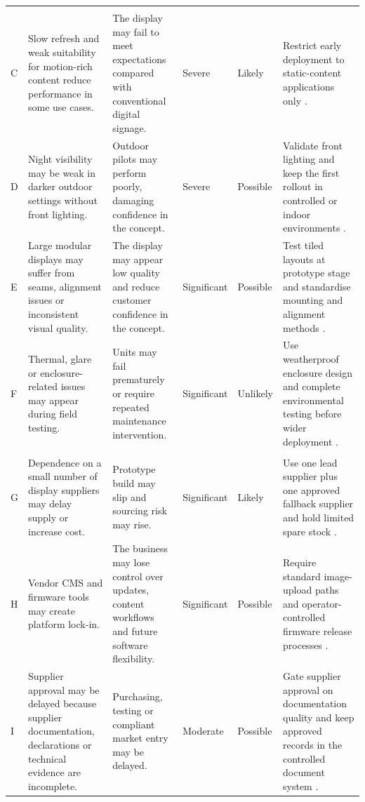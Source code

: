 \documentclass[11pt,a4paper]{article}
\begin{document}
\begin{longtable}{L{0.8cm}L{3.5cm}L{3.2cm}L{1.3cm}L{1.4cm}L{3.8cm}}
\addlinespace
{} \\
C & Slow refresh and weak suitability for motion-rich content reduce performance in some use cases. & The display may fail to meet expectations compared with conventional digital signage. & Severe & Likely & Restrict early deployment to static-content applications only \cite{ref2}. \\
D & Night visibility may be weak in darker outdoor settings without front lighting. & Outdoor pilots may perform poorly, damaging confidence in the concept. & Severe & Possible & Validate front lighting and keep the first rollout in controlled or indoor environments \cite{ref2}. \\
E & Large modular displays may suffer from seams, alignment issues or inconsistent visual quality. & The display may appear low quality and reduce customer confidence in the concept. & Significant & Possible & Test tiled layouts at prototype stage and standardise mounting and alignment methods \cite{ref2}. \\
F & Thermal, glare or enclosure-related issues may appear during field testing. & Units may fail prematurely or require repeated maintenance intervention. & Significant & Unlikely & Use weatherproof enclosure design and complete environmental testing before wider deployment \cite{ref2}. \\

\addlinespace
{} \\
G & Dependence on a small number of display suppliers may delay supply or increase cost. & Prototype build may slip and sourcing risk may rise. & Significant & Likely & Use one lead supplier plus one approved fallback supplier and hold limited spare stock \cite{ref14,ref15}. \\
H & Vendor CMS and firmware tools may create platform lock-in. & The business may lose control over updates, content workflows and future software flexibility. & Significant & Possible & Require standard image-upload paths and operator-controlled firmware release processes \cite{ref14,ref15}. \\
I & Supplier approval may be delayed because supplier documentation, declarations or technical evidence are incomplete. & Purchasing, testing or compliant market entry may be delayed. & Moderate & Possible & Gate supplier approval on documentation quality and keep approved records in the controlled document system \cite{ref14}. \\


\end{longtable}
\end{document}
